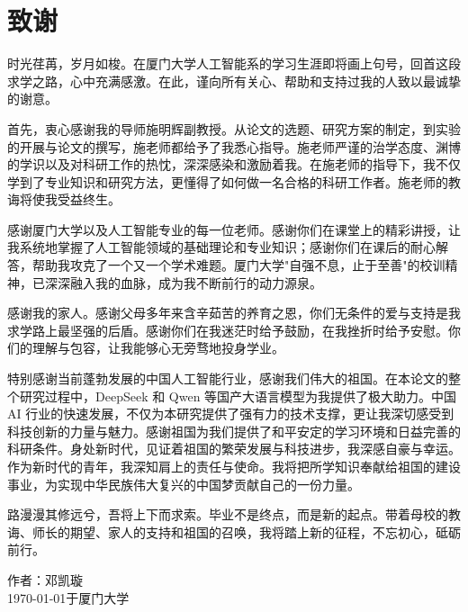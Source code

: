 
\chapter*{致谢}

时光荏苒，岁月如梭。在厦门大学人工智能系的学习生涯即将画上句号，回首这段求学之路，心中充满感激。在此，谨向所有关心、帮助和支持过我的人致以最诚挚的谢意。

首先，衷心感谢我的导师施明辉副教授。从论文的选题、研究方案的制定，到实验的开展与论文的撰写，施老师都给予了我悉心指导。施老师严谨的治学态度、渊博的学识以及对科研工作的热忱，深深感染和激励着我。在施老师的指导下，我不仅学到了专业知识和研究方法，更懂得了如何做一名合格的科研工作者。施老师的教诲将使我受益终生。

感谢厦门大学以及人工智能专业的每一位老师。感谢你们在课堂上的精彩讲授，让我系统地掌握了人工智能领域的基础理论和专业知识；感谢你们在课后的耐心解答，帮助我攻克了一个又一个学术难题。厦门大学"自强不息，止于至善"的校训精神，已深深融入我的血脉，成为我不断前行的动力源泉。

感谢我的家人。感谢父母多年来含辛茹苦的养育之恩，你们无条件的爱与支持是我求学路上最坚强的后盾。感谢你们在我迷茫时给予鼓励，在我挫折时给予安慰。你们的理解与包容，让我能够心无旁骛地投身学业。

特别感谢当前蓬勃发展的中国人工智能行业，感谢我们伟大的祖国。在本论文的整个研究过程中，DeepSeek 和 Qwen 等国产大语言模型为我提供了极大助力。中国 AI 行业的快速发展，不仅为本研究提供了强有力的技术支撑，更让我深切感受到科技创新的力量与魅力。感谢祖国为我们提供了和平安定的学习环境和日益完善的科研条件。身处新时代，见证着祖国的繁荣发展与科技进步，我深感自豪与幸运。作为新时代的青年，我深知肩上的责任与使命。我将把所学知识奉献给祖国的建设事业，为实现中华民族伟大复兴的中国梦贡献自己的一份力量。

路漫漫其修远兮，吾将上下而求索。毕业不是终点，而是新的起点。带着母校的教诲、师长的期望、家人的支持和祖国的召唤，我将踏上新的征程，不忘初心，砥砺前行。

\begin{flushright}
作者：邓凯璇 \\
\today 于厦门大学
\end{flushright}
